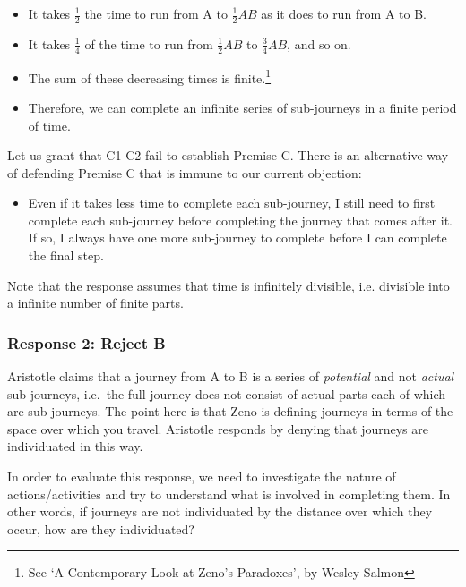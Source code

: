 \documentclass[]{article}
\begin{document}
\begin{itemize}
\item
  It takes \(\frac{1}{2}\) the time to run from A to \(\frac{1}{2}AB\)
  as it does to run from A to B.
\item
  It takes \(\frac{1}{4}\) of the time to run from \(\frac{1}{2}AB\) to
  \(\frac{3}{4}AB\), and so on.
\item
  The sum of these decreasing times is finite.\footnote{See `A
    Contemporary Look at Zeno's Paradoxes', by Wesley Salmon}
\item
  Therefore, we can complete an infinite series of sub-journeys in a
  finite period of time.
\end{itemize}

Let us grant that C1-C2 fail to establish Premise C. There is an
alternative way of defending Premise C that is immune to our current
objection:

\begin{itemize}
\itemsep1pt\parskip0pt
\item
  Even if it takes less time to complete each sub-journey, I still need
  to first complete each sub-journey before completing the journey that
  comes after it. If so, I always have one more sub-journey to complete
  before I can complete the final step.
\end{itemize}

Note that the response assumes that time is infinitely divisible, i.e.
divisible into a infinite number of finite parts. 

\subsubsection{Response 2: Reject B}\label{response-2-reject-b}

Aristotle claims that a journey from A to B is a series of
\emph{potential} and not \emph{actual} sub-journeys, i.e.~the full
journey does not consist of actual parts each of which are sub-journeys.
The point here is that Zeno is defining journeys in terms of the space
over which you travel. Aristotle responds by denying that journeys are
individuated in this way.

In order to evaluate this response, we need to investigate the nature of
actions/activities and try to understand what is involved in completing
them. In other words, if journeys are not individuated by the distance
over which they occur, how are they individuated?
\end{document}
